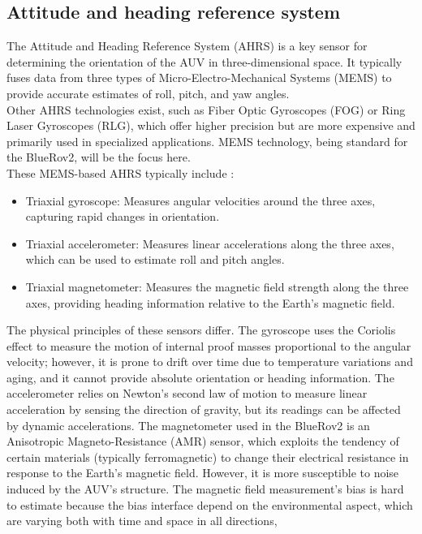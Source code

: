 \subsection{Attitude and heading reference system}
The Attitude and Heading Reference System (AHRS) is a key sensor for determining the orientation of the AUV in three-dimensional space.
It typically fuses data from three types of Micro-Electro-Mechanical Systems (MEMS) to provide accurate estimates of roll, pitch, and yaw angles.\\
Other AHRS technologies exist, such as Fiber Optic Gyroscopes (FOG) or Ring Laser Gyroscopes (RLG), which offer higher precision but are more expensive and primarily used in 
specialized applications. MEMS technology, being standard for the BlueRov2, will be the focus here.\\
These MEMS-based AHRS typically include \cite{klugaMotionSensorsData2024}:
\begin{itemize}
    \item Triaxial gyroscope: Measures angular velocities around the three axes, capturing rapid changes in orientation.
    \item Triaxial accelerometer: Measures linear accelerations along the three axes, which can be used to estimate roll and pitch angles.
    \item Triaxial magnetometer: Measures the magnetic field strength along the three axes, providing heading information relative to the Earth's magnetic field.
\end{itemize}
The physical principles of these sensors differ. The gyroscope uses the Coriolis effect to measure the motion of internal proof masses proportional to the angular 
velocity; however, it is prone to drift over time due to temperature variations and aging, and it cannot provide absolute orientation or heading information. 
The accelerometer relies on Newton's second law of motion to measure linear acceleration by sensing the direction of gravity, but its readings can be affected by dynamic accelerations. 
The magnetometer used in the BlueRov2 is an Anisotropic Magneto-Resistance (AMR) sensor, which exploits the tendency of certain materials (typically ferromagnetic) to change 
their electrical resistance in response to the Earth's magnetic field. However, it is more susceptible to noise induced by the AUV's structure. The magnetic field measurement's bias is hard to 
estimate \cite{troniMagnetometerBiasCalibration2014} because the bias interface depend on the environmental aspect, which are varying both with time and space in all directions, 
